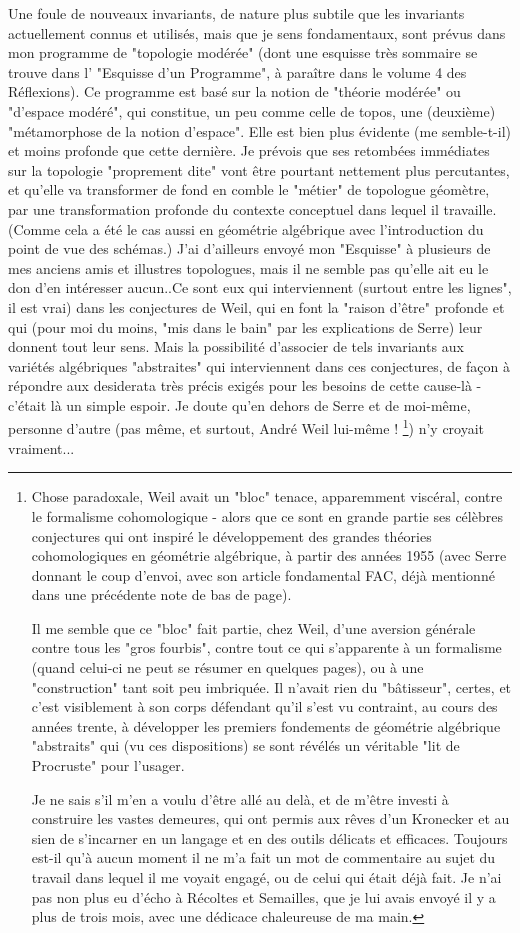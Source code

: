 {Une foule de nouveaux invariants, de nature plus subtile que les invariants actuellement connus et utilisés, mais que je sens fondamentaux, sont prévus dans mon programme de "topologie modérée" (dont une esquisse très sommaire se trouve dans l' "Esquisse d'un Programme", à paraître dans le volume 4 des Réflexions). Ce programme est basé sur la notion de "théorie modérée" ou "d'espace modéré", qui constitue, un peu comme celle de topos, une (deuxième) "métamorphose de la notion d'espace". Elle est bien plus évidente (me semble-t-il) et moins profonde que cette dernière. Je prévois que ses retombées immédiates sur la topologie "proprement dite" vont être pourtant nettement plus percutantes, et qu'elle va transformer de fond en comble le "métier" de topologue géomètre, par une transformation profonde du contexte conceptuel dans lequel il travaille. (Comme cela a été le cas aussi en géométrie algébrique avec l'introduction du point de vue des schémas.) J'ai d'ailleurs envoyé mon "Esquisse" à plusieurs de mes anciens amis et illustres topologues, mais il ne semble pas qu'elle ait eu le don d'en intéresser aucun.}.Ce sont eux qui interviennent (surtout entre les lignes", il est vrai) dans les conjectures de Weil, qui en font la "raison d'être" profonde et qui (pour moi du moins, "mis dans le bain" par les explications de Serre) leur donnent tout leur sens. Mais la possibilité d'associer de tels invariants aux variétés algébriques "abstraites" qui interviennent dans ces conjectures, de façon à répondre aux desiderata très précis exigés pour les besoins de cette cause-là - c'était là un simple espoir. Je doute qu'en dehors de Serre et de moi-même, personne d'autre (pas même, et surtout, André Weil lui-même ! \footnote{Chose paradoxale, Weil avait un "bloc" tenace, apparemment viscéral, contre le formalisme cohomologique - alors que ce sont en grande partie ses célèbres conjectures qui ont inspiré le développement des grandes théories cohomologiques en géométrie algébrique, à partir des années 1955 (avec Serre donnant le coup d'envoi, avec son article fondamental FAC, déjà mentionné dans une précédente note de bas de page).

Il me semble que ce "bloc" fait partie, chez Weil, d'une aversion générale contre tous les "gros fourbis", contre tout ce qui s'apparente à un formalisme (quand celui-ci ne peut se résumer en quelques pages), ou à une "construction" tant soit peu imbriquée. Il n'avait rien du "bâtisseur", certes, et c'est visiblement à son corps défendant qu'il s'est vu contraint, au cours des années trente, à développer les premiers fondements de géométrie algébrique "abstraits" qui (vu ces dispositions) se sont révélés un véritable "lit de Procruste" pour l'usager.

Je ne sais s'il m'en a voulu d'être allé au delà, et de m'être investi à construire les vastes demeures, qui ont permis aux rêves d'un Kronecker et au sien de s'incarner en un langage et en des outils délicats et efficaces. Toujours est-il qu'à aucun moment il ne m'a fait un mot de commentaire au sujet du travail dans lequel il me voyait engagé, ou de celui qui était déjà fait. Je n'ai pas non plus eu d'écho à Récoltes et Semailles, que je lui avais envoyé il y a plus de trois mois, avec une dédicace chaleureuse de ma main.}) n’y croyait vraiment...

